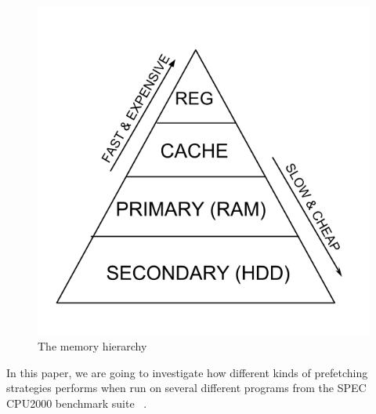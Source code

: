 \begin{figure}[H]
	\centering
	\includegraphics[scale=0.3]{./figures/memhier}
	\caption{The memory hierarchy}
	\label{fig:mem_hier}
\end{figure}

In this paper, we are going to investigate how different kinds of
prefetching strategies performs when run on several different programs from the SPEC CPU2000 benchmark
suite ~\cite{SPECFAQ}.
